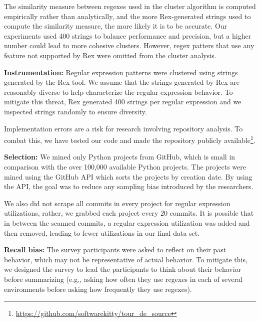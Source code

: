 \documentclass{sig-alternate-05-2015}
\newcommand{\todoNow}[1]{\textbf{\textcolor{red}{TODO.NOW: #1}}} %
\begin{document}
The similarity measure between regexes used in the cluster algorithm is computed empirically rather than analytically, and the more Rex-generated strings used to compute the similarity measure, the more likely it is to be accurate. Our experiments used 400 strings to balance performance and precision, but a higher number could lead to more cohesive clusters. However, regex patters that use any feature not supported by Rex were omitted from the cluster analysis. 


\textbf{Instrumentation:} Regular expression patterns were clustered using strings generated by the Rex tool.  We assume that the strings generated by Rex are reasonably diverse to help characterize the regular expression behavior. To mitigate this threat, Rex generated 400 strings per regular expression and we inspected strings randomly to ensure diversity.

Implementation errors are a risk for research involving repository analysis. To combat this, we have tested our code and made the repository publicly available\footnote{\url{https://github.com/softwarekitty/tour_de_source}}.

\textbf{Selection:} We mined only  Python projects from GitHub, which is  small in comparison with the over 100,000 available Python projects. The projects were mined using the GitHub API which sorts the projects by creation date. By using the API, the goal was to reduce any sampling bias introduced by the researchers.

We also did not scrape all commits in every project for regular expression utilizations, rather, we grabbed each project every 20 commits. It is possible that in between the scanned commits, a regular expression utilization was added and then removed, leading to fewer utilizations in our final data set.

\textbf{Recall bias:} The survey participants were asked to reflect on their past behavior, which may not be representative of actual behavior. To mitigate this, we designed the survey to lead the participants to think about their behavior before summarizing (e.g., asking how often they use regexes in each of several environments before asking how frequently they use regexes). 
\end{document}
